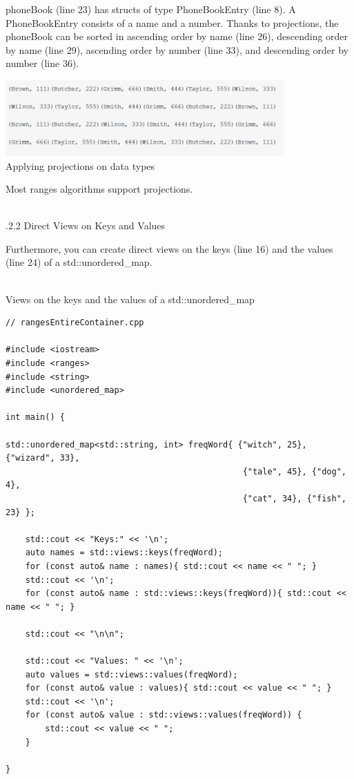 phoneBook (line 23) has structs of type PhoneBookEntry (line 8). A PhoneBookEntry consists of a name and a number. Thanks to projections, the phoneBook can be sorted in ascending order by name (line 26), descending order by name (line 29), ascending order by number (line 33), and descending order by number (line 36).

\begin{center}
\includegraphics[width=0.8\textwidth]{content/3/chapter5/images/1-1.png}\\
Applying projections on data types
\end{center}

Most ranges algorithms support projections.

\hspace*{\fill} \\ %
.2.2\hspace{0.2cm} Direct Views on Keys and Values

Furthermore, you can create direct views on the keys (line 16) and the values (line 24) of a std::unordered\_map.

\hspace*{\fill} \\ %
\noindent
Views on the keys and the values of a std::unordered\_map
\begin{lstlisting}[style=styleCXX]
// rangesEntireContainer.cpp

#include <iostream>
#include <ranges>
#include <string>
#include <unordered_map>

int main() {

std::unordered_map<std::string, int> freqWord{ {"witch", 25}, {"wizard", 33},
												{"tale", 45}, {"dog", 4},
												{"cat", 34}, {"fish", 23} };

	std::cout << "Keys:" << '\n';
	auto names = std::views::keys(freqWord);
	for (const auto& name : names){ std::cout << name << " "; }
	std::cout << '\n';
	for (const auto& name : std::views::keys(freqWord)){ std::cout << name << " "; }
	
	std::cout << "\n\n";

	std::cout << "Values: " << '\n';
	auto values = std::views::values(freqWord);
	for (const auto& value : values){ std::cout << value << " "; }
	std::cout << '\n';
	for (const auto& value : std::views::values(freqWord)) {
		std::cout << value << " ";
	}

}
\end{lstlisting}

